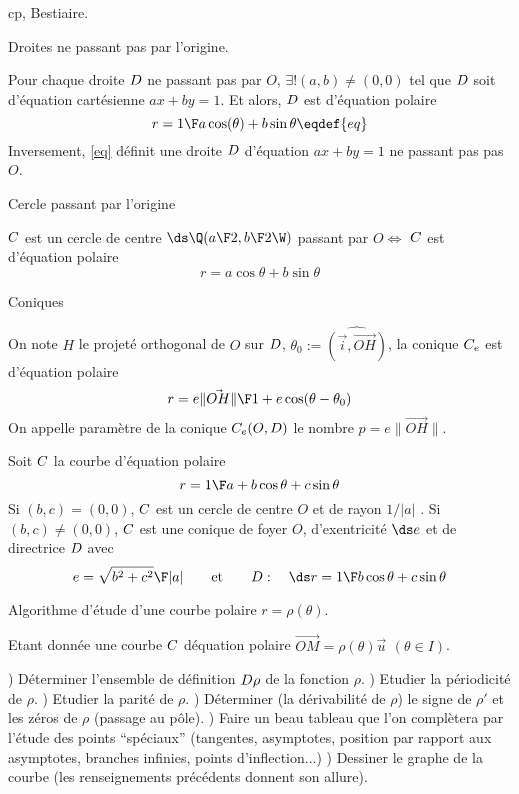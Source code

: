 \Subsection cp, Bestiaire. 
\bigskip

\Concept Droites ne passant pas par l'origine. 

Pour chaque droite $\sc D$ ne passant pas par $O$, $\exists!(a,b)\neq (0,0)$ tel que 
$\sc D$ soit d'équation cartésienne $ax+by=1$. Et alors, 
$\sc D$ est d'équation polaire 
$$
r={1\F a\cos(\theta)+b\sin\theta}\eqdef{eq}
$$
Inversement, \eqref{eq} définit une droite $\sc D$ d'équation $ax+by=1$ ne passant pas pas $O$. 
\bigskip

\Concept Cercle passant par l'origine

\Propriete $\sc C$ est un cercle de centre $\ds\Q({a\F2},{b\F2}\W)$ passant par $O\Longleftrightarrow$ 
$\sc C$ est d'équation polaire 
$$
r=a\cos\theta+b\sin\theta
$$

\Concept Coniques 

On note $H$ le projeté orthogonal de $O$ sur $\sc D$, 
$\theta_0:=\widehat{(\vec i,\vec{OH})}$, la conique $\sc C_e$ est d'équation polaire 
$$
r={e\|\vec {OH}\|\F1+e\cos(\theta-\theta_0)}
$$
On appelle paramètre de la conique $\sc C_e(O,\sc D)$ le nombre $p=e\|\vec{OH}\|$. 
\bigskip

Soit $\sc C$ la courbe d'équation polaire 
$$
r={1\F a+b\cos\theta+c\sin\theta}
$$ 
Si $(b,c)=(0,0)$, $\sc C$ est un cercle de centre $O$ et de rayon $1/|a|$ . \pn
Si $(b,c)\neq(0,0)$, $\sc C$ est une conique de foyer $O$, d'exentricité $\ds e$ 
et de directrice $\sc D$ avec 
$$
e={\sqrt{b^2+c^2}\F|a|}\qquad\mbox{et}\qquad \sc D:\quad \ds r={1\F b\cos\theta+c\sin\theta}
$$

\Concept Algorithme d'étude d'une courbe polaire $r=\rho(\theta)$. 

Etant donnée une courbe $\sc C$ déquation polaire $\vec{OM}=\rho(\theta)\vec u\ \,(\theta\in I)$.  
\bigskip

) Déterminer l'ensemble de définition $\sc D\rho$ de la fonction $\rho$. ) Etudier la périodicité de $\rho$. ) Etudier la parité de $\rho$. ) Déterminer (la dérivabilité de $\rho$) le signe de $\rho'$ 
et les zéros de $\rho$ (passage au pôle). ) Faire un beau tableau que l'on complètera par l'étude des points ``spéciaux'' 
(tangentes, asymptotes, position par rapport aux asymptotes, branches infinies, 
points d'inflection...)
) Dessiner le graphe de la courbe (les renseignements précédents donnent son allure). 
\bigskip


